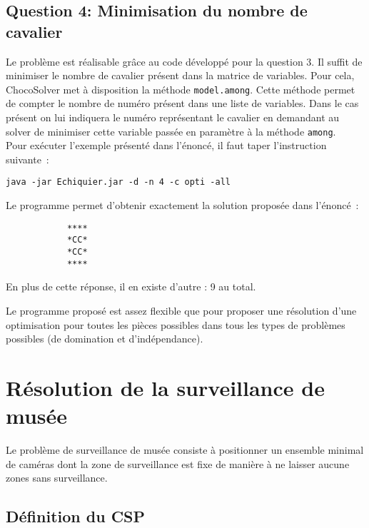\documentclass[a4paper,11pt]{article}
\begin{document}
    \subsection{Question 4: Minimisation du nombre de cavalier}
    	Le problème est réalisable grâce au code développé pour la question 3. Il suffit de minimiser le nombre de cavalier présent dans la matrice de variables. Pour cela, ChocoSolver met à disposition la méthode \verb|model.among|.  Cette méthode permet de compter le nombre de numéro présent dans une liste de variables. Dans le cas présent on lui indiquera le numéro représentant le cavalier en demandant au solver de minimiser cette variable passée en paramètre à la méthode \verb|among|.\\
        Pour exécuter l'exemple présenté dans l'énoncé, il faut taper l'instruction suivante~:
        \begin{verbatim}
java -jar Echiquier.jar -d -n 4 -c opti -all
        \end{verbatim}
        Le programme permet d'obtenir exactement la solution proposée dans l'énoncé~:
        \begin{verbatim}
            ****
            *CC*
            *CC*
            ****
        \end{verbatim}
        En plus de cette réponse, il en existe d'autre : 9 au total.\\
        \begin{tcolorbox}[title=Remarque :]
        	Le programme proposé est assez flexible que pour proposer une résolution d'une optimisation pour toutes les pièces possibles dans tous les types de problèmes possibles (de domination et d'indépendance).
        \end{tcolorbox}
    
\section{Résolution de la surveillance de musée}

	Le problème de surveillance de musée consiste à positionner un ensemble minimal de caméras dont la zone de surveillance est fixe de manière à ne laisser aucune zones sans surveillance.

	\subsection{Définition du CSP}
    
\end{document}
